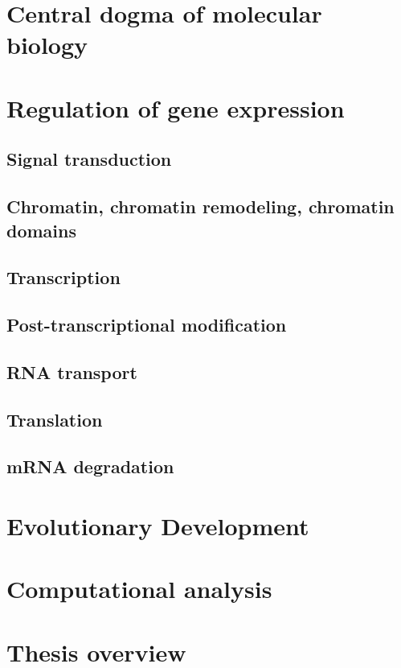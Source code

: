 \section{Central dogma of molecular biology}

\section{Regulation of gene expression}
\subsection{Signal transduction}
\subsection{Chromatin, chromatin remodeling, chromatin domains}
\subsection{Transcription}
\subsection{Post-transcriptional modification}
\subsection{RNA transport}
\subsection{Translation}
\subsection{mRNA degradation}

\section{Evolutionary Development}

\section{Computational analysis}

\section{Thesis overview}
